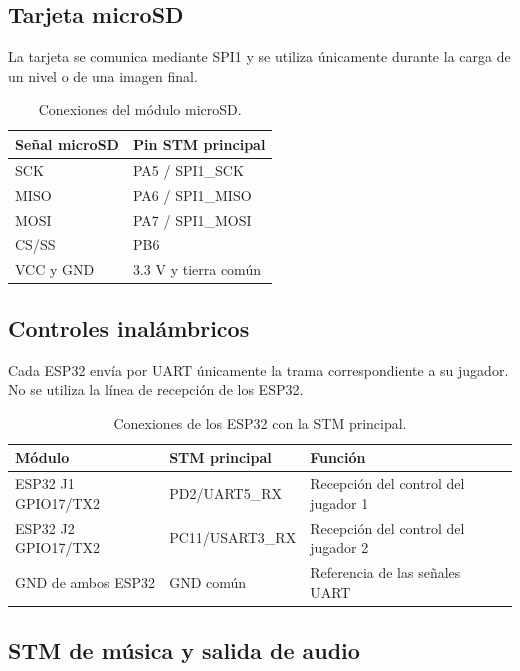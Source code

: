 \documentclass[11pt,letterpaper]{article}
\begin{document}
\subsection{Tarjeta microSD}

La tarjeta se comunica mediante SPI1 y se utiliza únicamente durante la carga de
un nivel o de una imagen final.

\begin{table}[htbp]
\centering
\small
\caption{Conexiones del módulo microSD.}
\begin{tabularx}{0.78\textwidth}{@{}YY@{}}
\toprule
\textbf{Señal microSD} & \textbf{Pin STM principal} \\
\midrule
SCK & PA5 / SPI1\_SCK \\
MISO & PA6 / SPI1\_MISO \\
MOSI & PA7 / SPI1\_MOSI \\
CS/SS & PB6 \\
VCC y GND & 3.3 V y tierra común \\
\bottomrule
\end{tabularx}
\end{table}

\subsection{Controles inalámbricos}

Cada ESP32 envía por UART únicamente la trama correspondiente a su jugador. No se
utiliza la línea de recepción de los ESP32.

\begin{table}[htbp]
\centering
\small
\caption{Conexiones de los ESP32 con la STM principal.}
\begin{tabularx}{\textwidth}{@{}l l Y@{}}
\toprule
\textbf{Módulo} & \textbf{STM principal} & \textbf{Función} \\
\midrule
ESP32 J1 GPIO17/TX2 & PD2/UART5\_RX & Recepción del control del jugador 1 \\
ESP32 J2 GPIO17/TX2 & PC11/USART3\_RX & Recepción del control del jugador 2 \\
GND de ambos ESP32 & GND común & Referencia de las señales UART \\
\bottomrule
\end{tabularx}
\end{table}

\subsection{STM de música y salida de audio}
\end{document}
